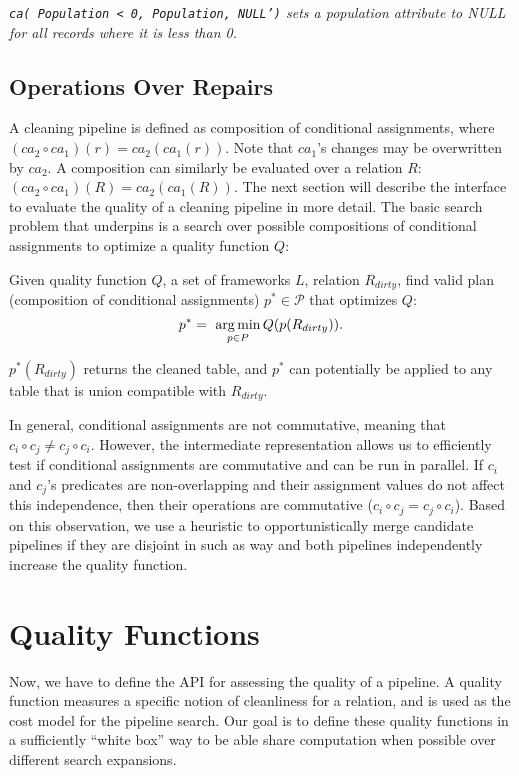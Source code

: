  \begin{example}\it
  \texttt{ca( Population < 0, Population, NULL')} sets a population attribute to NULL for all records where it is less than 0. 
 \end{example}

\subsection{Operations Over Repairs}
A cleaning pipeline is defined as composition of conditional assignments, where $(ca_2 \circ ca_1)(r) = ca_2(ca_1(r))$. Note that $ca_1$'s changes may be overwritten by $ca_2$.  A composition can similarly be evaluated over a relation $R$: $(ca_2\circ ca_1)(R) = ca_2(ca_1(R))$.    
The next section will describe the interface to evaluate the quality of a cleaning pipeline in more detail. The basic search problem that underpins \sys is a search over possible compositions of conditional assignments to optimize a quality function $Q$:
\begin{problem}%
Given quality function $Q$, a set of frameworks $L$, relation $R_{dirty}$, find valid plan (composition of conditional assignments) $p^* \in \mathcal{P}$ that optimizes $Q$:
\[
p^* = ~ \operatorname*{arg\,min}_{p \in P} Q( p(R_{dirty}) ).  
\]
\end{problem}
$p^*(R_{dirty})$ returns the cleaned table, and $p^*$ can potentially be applied to any table that is union compatible with $R_{dirty}$. 

In general, conditional assignments are not commutative, meaning that $c_i\circ c_j \ne c_j\circ c_i$.  However, the intermediate representation allows us to efficiently test if conditional assignments are commutative and can be run in parallel.
If $c_i$ and $c_j$'s predicates are non-overlapping and their assignment values do not affect this independence, then their operations are commutative ($c_i\circ c_j = c_j\circ c_i$). 
Based on this observation, we use a heuristic to opportunistically merge candidate pipelines if they are disjoint in such as way and both pipelines independently increase the quality function.


\section{Quality Functions}
Now, we have to define the API for assessing the quality of a pipeline.
A quality function measures a specific notion of cleanliness for a relation, and is used as the cost model for the pipeline search.  
Our goal is to define these quality functions in a sufficiently ``white box'' way to be able share computation when possible over different search expansions.

